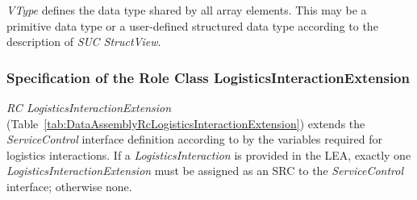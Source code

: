 \emph{VType} defines the data type shared by all array elements. This may be a primitive data type or a user-defined structured data type according to the description of \emph{SUC StructView}.

\subsubsection{Specification of the Role Class LogisticsInteractionExtension}

\emph{RC LogisticsInteractionExtension} (Table~\ref{tab:DataAssemblyRcLogisticsInteractionExtension}) extends the \emph{ServiceControl} interface definition according to \cite{PNO.2025.Part4} by the variables required for logistics interactions. If a \emph{LogisticsInteraction} is provided in the LEA, exactly one \emph{LogisticsInteractionExtension} must be assigned as an SRC to the \emph{ServiceControl} interface; otherwise none.

